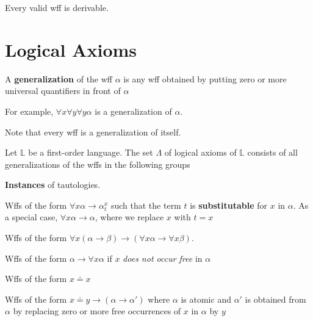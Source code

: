 \begin{theorem}[Completeness]
    \label{thm:FOCompleteness}
    Every valid wff is derivable.
\end{theorem}

\section{Logical Axioms}

\begin{definition}[Generalization]
    A \textbf{generalization} of the wff $\alpha$ is any wff obtained by putting zero or more universal quantifiers in front of $\alpha$
\end{definition}

For example, $\forall x\forall y\forall y\alpha$ is a generalization of $\alpha$.

Note that every wff is a generalization of itself.

\begin{definition}[Axioms]
    Let $\mathbb{L}$ be a first-order language. The set $\Lambda$ of logical axioms of $\mathbb{L}$ consists of all generalizations of the wffs in the following groups
    \begin{axiom}
        \label{axiom:InstanceOfTautology}
        \textbf{Instances} of tautologies.
    \end{axiom}
    \begin{axiom}
        \label{axiom:Substitution}
        Wffs of the form $\forall x\alpha \to \alpha_t^x$ such that the term $t$ is \textbf{substitutable} for $x$ in $\alpha$. As a special case, $\forall x\alpha \to \alpha$, where we replace $x$ with $t=x$
    \end{axiom}
    \begin{axiom}
        \label{axiom:PushUniversalIntoImplication}
        Wffs of the form $\forall x(\alpha\to\beta) \to (\forall x \alpha\to \forall x \beta)$.
    \end{axiom}
    \begin{axiom}
        \label{axiom:QuantifyBoundedVar}
        Wffs of the form $\alpha\to\forall x \alpha$ if $x$ \emph{does not occur free} in $\alpha$
    \end{axiom}
    \begin{axiom}
        \label{axiom:Equality}
        Wffs of the form $x \doteq x$
    \end{axiom}
    \begin{axiom}
        \label{axiom:EqualitySubstitution}
        Wffs of the form $x \doteq y \to (\alpha \to \alpha')$ where $\alpha$ is atomic and $\alpha'$ is obtained from $\alpha$ by replacing zero or more free occurrences of $x$ in $\alpha$ by $y$
    \end{axiom}
\end{definition}

